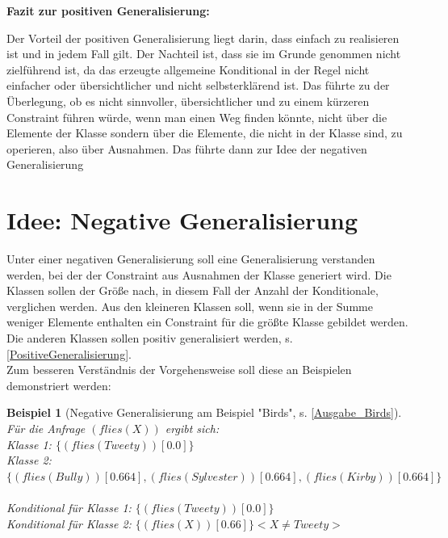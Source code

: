 \documentclass[a4paper, 11pt]{book}
\newtheorem{Bsp}{Beispiel}[section]
\begin{document}
\textbf{{\Large Fazit zur positiven Generalisierung:}}\label{Fazit pos Gen} 
\noindent

Der Vorteil der positiven Generalisierung liegt darin, dass einfach zu realisieren ist und in jedem Fall gilt. Der Nachteil ist, dass sie im Grunde genommen nicht zielführend ist, da das erzeugte allgemeine Konditional in der Regel nicht einfacher oder übersichtlicher und nicht selbsterklärend ist. Das führte zu der Überlegung, ob es nicht sinnvoller, übersichtlicher und zu einem kürzeren Constraint führen würde, wenn man einen Weg finden könnte, nicht über die Elemente der Klasse sondern über die Elemente, die nicht in der Klasse sind, zu operieren,  also über Ausnahmen. Das führte dann zur Idee der negativen Generalisierung 

\section{Idee: Negative Generalisierung}
\label{NegativeGeneralisierung}
Unter einer negativen Generalisierung soll eine Generalisierung verstanden werden, bei der der Constraint aus Ausnahmen der Klasse generiert wird. Die Klassen sollen der Größe nach, in diesem Fall der Anzahl der Konditionale, verglichen werden. Aus den kleineren Klassen soll, wenn sie in der Summe weniger Elemente enthalten ein Constraint für die größte Klasse gebildet werden. Die anderen Klassen sollen positiv generalisiert werden, s. \ref{PositiveGeneralisierung}.\\
Zum besseren Verständnis der Vorgehensweise soll diese an Beispielen demonstriert werden:
\begin{Bsp}[Negative Generalisierung am Beispiel "{}Birds"{}, s. \ref{Ausgabe_Birds}]
	\label{Bsp:Neg_Gen_Birds} Für die Anfrage $ (flies(X)) $ ergibt sich: \\
	
	\noindent
	Klasse 1: $\{(flies(Tweety))[0.0]\}$\\
	Klasse 2: $\{(flies(Bully))[0.664], (flies(Sylvester))[0.664], (flies(Kirby))[0.664]\}$\\
	\\
Konditional für Klasse 1: $\{(flies(Tweety))[0.0]\}$\\
Konditional für Klasse 2: $\{(flies(X))[0.66]\} <X \neq Tweety>$\\
\end{Bsp}
 
\end{document}
